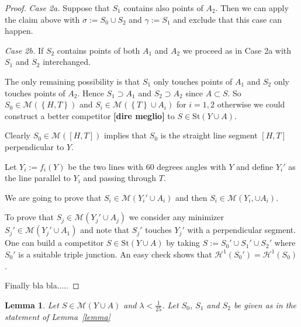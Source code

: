 \documentclass{article}
\renewcommand{\H}{\mathcal H}
\newcommand{\Enclose}[1]{\left[#1\right]}
\newcommand{\ENCLOSE}[1]{\left\{#1\right\}}
\newcommand{\St}{\mathrm{St}}
\newcommand{\M}{\mathcal{M}}
\renewcommand{\H}{\mathcal{H}}
\newtheorem{lemma}[theorem]{Lemma}
\theoremstyle{definition}
\theoremstyle{remark}
\begin{document}
\begin{proof}
\emph{Case 2a.} Suppose that $S_1$ contains also points of $A_2$.
Then we can apply the claim above with 
$\sigma:= S_0 \cup S_2$ and 
$\gamma:= S_1$ and exclude that this case can happen.

\emph{Case 2b.} If $S_2$ contains points of both $A_1$ and $A_2$ we proceed 
as in Case 2a with $S_1$ and $S_2$ interchanged.

The only remaining possibility is that $S_1$ only touches points of $A_1$ 
and $S_2$ only touches points of $A_2$. 
Hence $S_1\supset A_1$ and $S_2\supset A_2$ since $A\subset S$.
So $S_0\in \M(\ENCLOSE{H,T})$  
and $S_i \in \M(\ENCLOSE{T} \cup A_i)$ for $i=1,2$
otherwise we could construct a better competitor \textbf{[dire meglio]} to $S\in \St(Y\cup A)$.

Clearly $S_0\in \M(\Enclose{H,T})$ implies that $S_0$ is the straight 
line segment $[H,T]$ perpendicular to $Y$.

Let $Y_i:=f_i(Y)$ be the two lines with 60 degrees angles
with $Y$ and define $Y_i'$ as the line 
parallel to $Y_i$ and passing through $T$.

We are going to prove that $S_i\in \M(Y_i'\cup A_i)$ 
and then $S_i\in \M(Y_i,\cup A_i)$.

To prove that $S_j\in \M(Y_j'\cup A_j)$ we consider 
any minimizer $S_j' \in \M(Y_j'\cup A_1)$ 
and note that $S_j'$ touches $Y_j'$ with a perpendicular
segment. One can build a competitor $S\in \St(Y\cup A)$
by taking $S:= S_0' \cup S_1' \cup S_2'$ where $S_0'$ is 
a suitable triple junction.
An easy check shows that $\H^1(S_0') = \H^1(S_0)$.

Finally bla bla.....
\end{proof}

\begin{lemma}
  Let $S\in \M(Y\cup A)$ and $\lambda<\frac 1 {25}$.
  Let $S_0$, $S_1$ and $S_2$ be given as in the statement 
  of Lemma~\ref{lemma}
  
\end{lemma}
\end{document}
